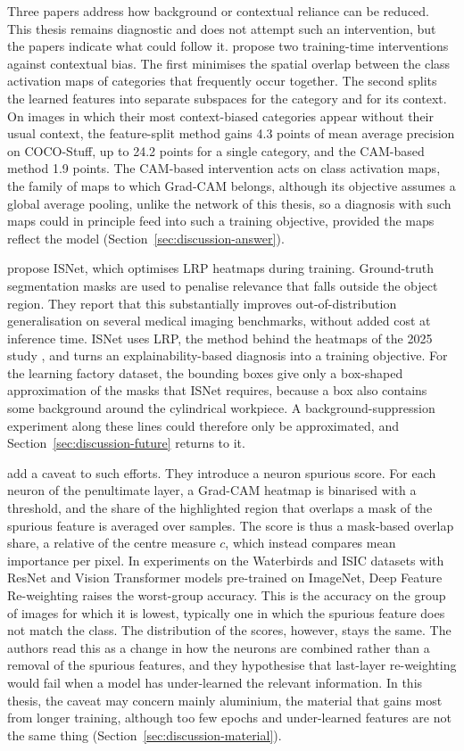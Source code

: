 Three papers address how background or contextual reliance can be reduced. This thesis
remains diagnostic and does not attempt such an intervention, but the papers indicate
what could follow it. \citet{singh2020dontjudge} propose two training-time
interventions against contextual bias. The first minimises the spatial overlap between
the class activation maps \citep{zhou2016cam} of categories that frequently occur
together. The second splits the learned features into separate subspaces for the
category and for its context. On images in which their most
context-biased categories appear without their usual context, the feature-split method
gains 4.3 points of mean average precision on COCO-Stuff, up to 24.2 points for a single
category, and the CAM-based method 1.9 points. The
CAM-based intervention acts on class activation maps, the family of maps to which Grad-CAM
belongs, although its objective assumes a global average pooling, unlike the network of
this thesis, so a diagnosis with such maps could in principle feed into such a training
objective, provided the maps reflect the model (Section~\ref{sec:discussion-answer}).

\citet{bassi2024isnet} propose ISNet, which optimises LRP heatmaps during
training. Ground-truth segmentation masks are used to penalise relevance that falls
outside the object region. They report that this substantially improves
out-of-distribution generalisation on several medical imaging benchmarks, without added
cost at inference time. ISNet uses LRP, the method behind the heatmaps of the 2025
study \citep{schneidereitYOLOv8}, and turns an explainability-based diagnosis into a
training objective. For the learning factory dataset, the bounding boxes give only a
box-shaped approximation of the masks that ISNet requires, because a box also contains
some background around the cylindrical workpiece. A background-suppression experiment
along these lines could therefore only be approximated, and
Section~\ref{sec:discussion-future} returns to it.

\citet{le2025shortcut} add a caveat to such efforts. They introduce a neuron
spurious score. For each neuron of the penultimate layer, a Grad-CAM heatmap is
binarised with a threshold, and the share of the highlighted region that overlaps a
mask of the spurious feature is averaged over samples. The score is thus a mask-based
overlap share, a relative of the centre measure $c$, which instead compares mean
importance per pixel. In experiments on the Waterbirds and ISIC datasets with ResNet and
Vision Transformer models pre-trained on ImageNet, Deep Feature
Re-weighting \citep{kirichenko2023dfr} raises the worst-group accuracy. This is the
accuracy on the group of images for which it is lowest, typically one in which the
spurious feature does not match the class. The distribution of the scores, however,
stays the same. The authors read this as a change in how the
neurons are combined rather than a removal of the spurious features, and they
hypothesise that last-layer re-weighting would fail when a model has under-learned the
relevant information. In this thesis, the caveat may concern mainly aluminium, the material that gains most
from longer training, although too few epochs and under-learned features are not the
same thing (Section~\ref{sec:discussion-material}).

